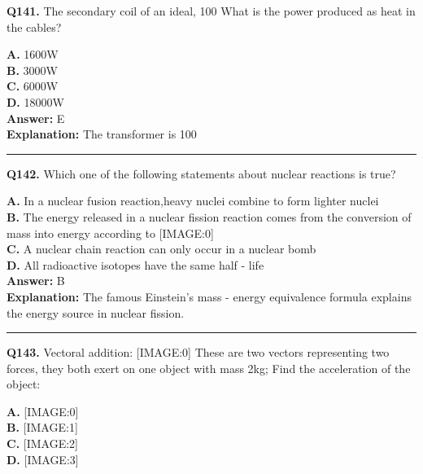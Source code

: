 \documentclass[12pt]{article}
\begin{document}
\noindent
\textbf{Q141.} The secondary coil of an ideal, 100%
What is the power produced as heat in the cables?



\textbf{A.} 1600W \\
\textbf{B.} 3000W \\
\textbf{C.} 6000W \\
\textbf{D.} 18000W \\

\textbf{Answer:} E \\
\textbf{Explanation:} The transformer is 100%

\hrule
\vspace{1em}


\noindent
\textbf{Q142.} Which one of the following statements about nuclear reactions is true?



\textbf{A.} In a nuclear fusion reaction,heavy nuclei combine to form lighter nuclei \\
\textbf{B.} The energy released in a nuclear fission reaction comes from the conversion of mass into energy according to
[IMAGE:0] \\
\textbf{C.} A nuclear chain reaction can only occur in a nuclear bomb \\
\textbf{D.} All radioactive isotopes have the same half - life \\

\textbf{Answer:} B \\
\textbf{Explanation:} The famous Einstein's mass - energy equivalence formula explains the energy source in nuclear fission.

\hrule
\vspace{1em}


\noindent
\textbf{Q143.} Vectoral addition:
[IMAGE:0]
These are two vectors representing two forces, they both exert on one object with mass 2kg; Find the acceleration of the object:



\textbf{A.} [IMAGE:0] \\
\textbf{B.} [IMAGE:1] \\
\textbf{C.} [IMAGE:2] \\
\textbf{D.} [IMAGE:3] \\
\end{document}
